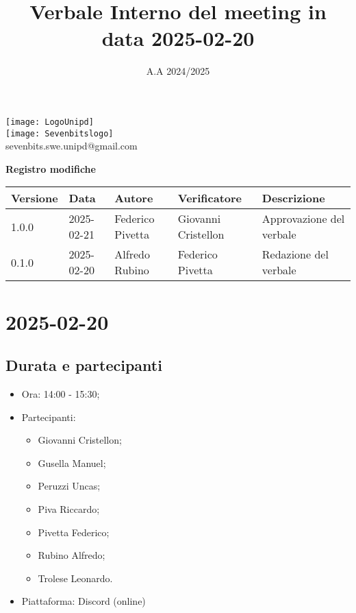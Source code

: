 \documentclass[10pt]{article}
\title{Verbale Interno del meeting in data 2025-02-20}
\date{A.A 2024/2025}
\begin{document}
\maketitle
\begin{center}
\texttt{[image: LogoUnipd]}\\
\texttt{[image: Sevenbitslogo]}\\
sevenbits.swe.unipd@gmail.com\\
\vspace{2mm}

\textbf{Registro modifiche}\\
\vspace{2mm}
\begin{tabularx}{\textwidth}{|l|l|l|l|X|}
\hline
\textbf{Versione} & \textbf{Data} & \textbf{Autore} & \textbf{Verificatore} & \textbf{Descrizione} \\
\hline
1.0.0 & 2025-02-21 & Federico Pivetta & Giovanni Cristellon & Approvazione del verbale \\
\hline
0.1.0 & 2025-02-20 & Alfredo Rubino & Federico Pivetta & Redazione del verbale \\
\hline
\end{tabularx}
\end{center}

\newpage
\tableofcontents
\newpage
\section{2025-02-20}
\subsection{Durata e partecipanti}
\begin{itemize}
\item Ora: 14:00 - 15:30;
\item Partecipanti:
	\begin{itemize}
    	\item Giovanni Cristellon;
		\item Gusella Manuel;
		\item Peruzzi Uncas;
		\item Piva Riccardo;
		\item Pivetta Federico;
		\item Rubino Alfredo;
		\item Trolese Leonardo.
	\end{itemize}
\item Piattaforma: Discord (online)
\end{itemize}
\end{document}
